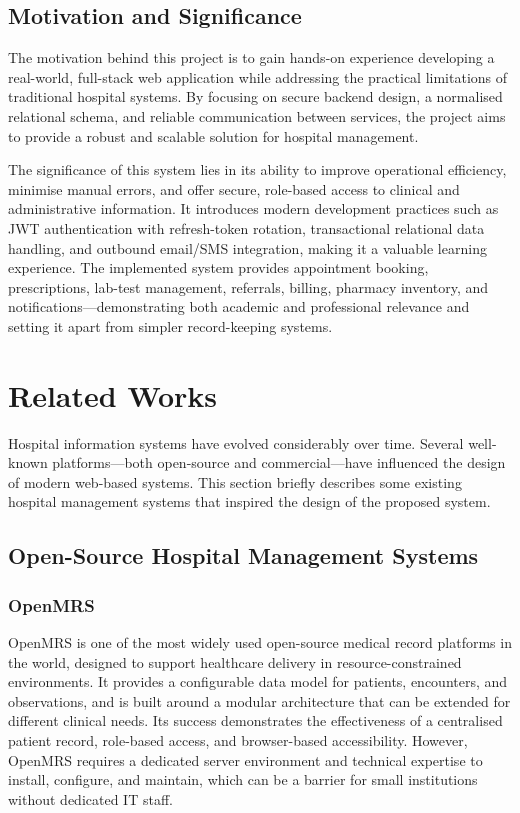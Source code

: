 \documentclass[12pt,a4paper]{report}
\begin{document}
\section{Motivation and Significance}
The motivation behind this project is to gain hands-on experience developing a
real-world, full-stack web application while addressing the practical limitations of
traditional hospital systems. By focusing on secure backend design, a normalised
relational schema, and reliable communication between services, the project aims to
provide a robust and scalable solution for hospital management.

The significance of this system lies in its ability to improve operational efficiency,
minimise manual errors, and offer secure, role-based access to clinical and
administrative information. It introduces modern development practices such as JWT
authentication with refresh-token rotation, transactional relational data handling, and
outbound email/SMS integration, making it a valuable learning experience. The
implemented system provides appointment booking, prescriptions, lab-test management,
referrals, billing, pharmacy inventory, and notifications---demonstrating both academic
and professional relevance and setting it apart from simpler record-keeping systems.

\chapter{Related Works}
Hospital information systems have evolved considerably over time. Several well-known
platforms---both open-source and commercial---have influenced the design of modern
web-based systems. This section briefly describes some existing hospital management
systems that inspired the design of the proposed system.

\section{Open-Source Hospital Management Systems}

\subsection*{OpenMRS}
OpenMRS is one of the most widely used open-source medical record platforms in the
world, designed to support healthcare delivery in resource-constrained environments. It
provides a configurable data model for patients, encounters, and observations, and is
built around a modular architecture that can be extended for different clinical needs.
Its success demonstrates the effectiveness of a centralised patient record,
role-based access, and browser-based accessibility. However, OpenMRS requires a
dedicated server environment and technical expertise to install, configure, and
maintain, which can be a barrier for small institutions without dedicated IT staff.
\end{document}
